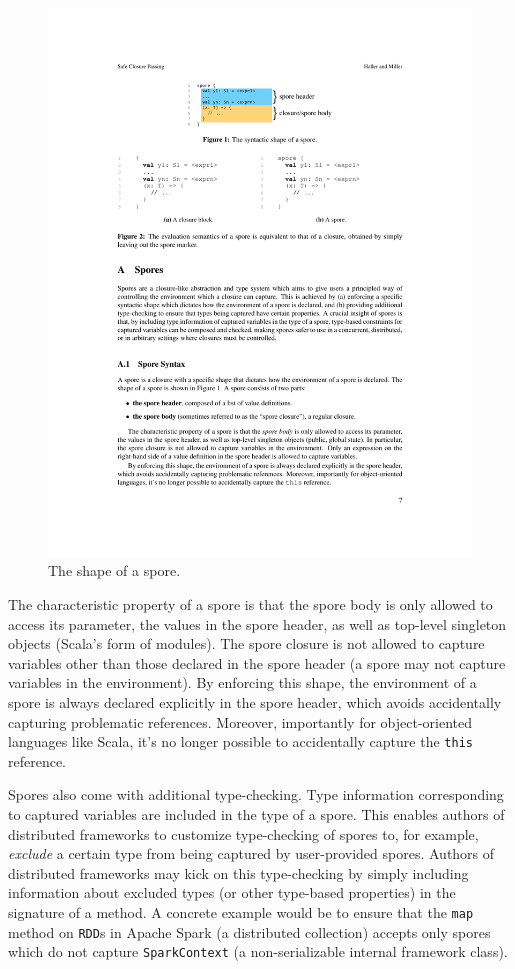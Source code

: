 \documentclass{jfp1}
\begin{document}
\begin{figure}[ht!]
\centering\includegraphics[width=0.75\columnwidth]{pic/spore-shape.pdf}
\caption{The shape of a spore.}\label{fig:spore-shape}
\end{figure}

\vspace{3mm}
The characteristic property of a spore is that the spore body is only allowed to
access its parameter, the values in the spore header, as well as top-level
singleton objects (Scala's form of modules). The spore closure is not allowed to
capture variables other than those declared in the spore header (\ie a spore may
not capture variables in the environment). By enforcing this shape, the
environment of a spore is always declared explicitly in the spore header, which
avoids accidentally capturing problematic references. Moreover, importantly for
object-oriented languages like Scala, it's no longer possible to accidentally
capture the \verb|this| reference.

Spores also come with additional type-checking. Type information corresponding
to captured variables are included in the type of a spore. This enables authors
of distributed frameworks to customize type-checking of spores to, for example,
{\em exclude} a certain type from being captured by user-provided spores.
Authors of distributed frameworks may kick on this type-checking by simply
including information about excluded types (or other type-based properties) in
the signature of a method. A concrete example would be to ensure that the
\verb|map| method on \verb|RDD|s in Apache Spark (a distributed collection)
accepts only spores which do not capture \verb|SparkContext| (a non-serializable
internal framework class).
\end{document}
